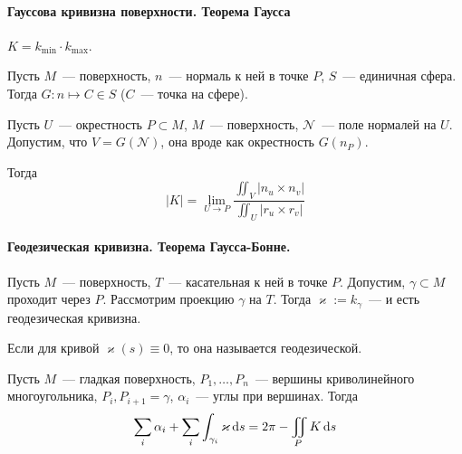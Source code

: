 \documentclass[draft,timbord]{longnotes}
\begin{document}
\paragraph{Гауссова кривизна поверхности. Теорема Гаусса}
\label{par:meas::gauss}

\begin{defn}\label{defn:meas::gauss::crvf}
  $K = k_{\min} \cdot k_{\max}$.
\end{defn}

\begin{defn}\label{defn:meas::gauss::map}
  Пусть $M$~--- поверхность, $n$~--- нормаль к ней в точке $P$, $S$~--- единичная сфера.
  Тогда $G: n \mapsto C \in S$ ($C$~--- точка на сфере).
\end{defn}

\begin{thrm}\label{thrm:meas::gauss::lim}
  Пусть $U$~--- окрестность $P \subset M$, $M$~--- поверхность, $\mathcal N$~--- поле нормалей
  на $U$. Допустим, что $V = G(\mathcal N)$, она вроде как окрестность $G(n_P)$. 

  Тогда \[
    |K| = \lim_{U \to P} \frac{\iint_V |n_u \times n_v|}{\iint_U|r_u \times r_v|} 
  \]
\end{thrm}

\paragraph{Геодезическая кривизна. Теорема Гаусса-Бонне.}
\label{par:dg::bonnet}

\begin{defn}\label{defn:dg::bonnet::geodcrvn}
  Пусть $M$~--- поверхность, $T$~--- касательная к ней в точке $P$. Допустим,
  $\gamma \subset M$ проходит через $P$. Рассмотрим проекцию $\gamma$ на $T$.
  Тогда $\varkappa := k_\gamma $~--- и есть геодезическая кривизна.
\end{defn}

\begin{defn}\label{defn:dg::bonnet::geodcurv}
  Если для кривой $\varkappa(s) \equiv 0$, то она называется геодезической.
\end{defn}

\begin{thrm}\label{thrm:dg::bonnet}
  Пусть $M$~--- гладкая поверхность, $P_1, \dotsc, P_n$~--- вершины криволинейного многоугольника,
  $P_i, P_{i+1} = \gamma $, $\alpha_i$~--- углы при вершинах. Тогда \[
    \sum_i \alpha_i + \sum_i \int _{\gamma_i} \varkappa \, \mathrm{d} s  = 2 \pi - \iint_P K \, \mathrm{d} s
  \]
\end{thrm}
\end{document}
